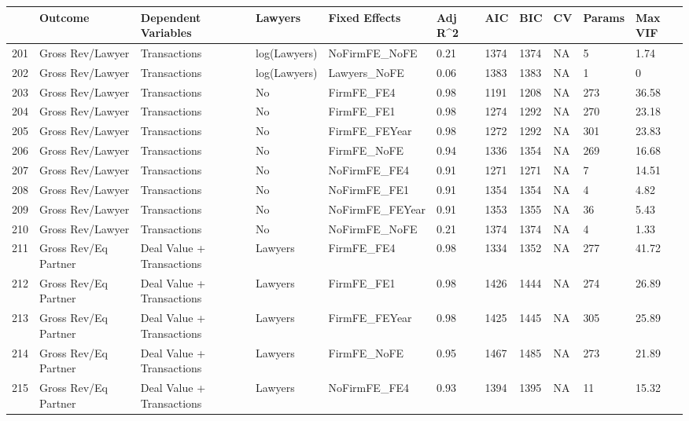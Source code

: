 \begin{table}[ht]
\centering
\begin{tabular}{rllllllllll}
  \hline
 & Outcome & Dependent Variables & Lawyers & Fixed Effects & Adj R^2 & AIC & BIC & CV & Params & Max VIF \\ 
  \hline
201 & Gross Rev/Lawyer & Transactions & log(Lawyers) & NoFirmFE\_NoFE & 0.21 & 1374 & 1374 & NA & 5 & 1.74 \\ 
  202 & Gross Rev/Lawyer & Transactions & log(Lawyers) & Lawyers\_NoFE & 0.06 & 1383 & 1383 & NA & 1 & 0 \\ 
  203 & Gross Rev/Lawyer & Transactions & No & FirmFE\_FE4 & 0.98 & 1191 & 1208 & NA & 273 & 36.58 \\ 
  204 & Gross Rev/Lawyer & Transactions & No & FirmFE\_FE1 & 0.98 & 1274 & 1292 & NA & 270 & 23.18 \\ 
  205 & Gross Rev/Lawyer & Transactions & No & FirmFE\_FEYear & 0.98 & 1272 & 1292 & NA & 301 & 23.83 \\ 
  206 & Gross Rev/Lawyer & Transactions & No & FirmFE\_NoFE & 0.94 & 1336 & 1354 & NA & 269 & 16.68 \\ 
  207 & Gross Rev/Lawyer & Transactions & No & NoFirmFE\_FE4 & 0.91 & 1271 & 1271 & NA & 7 & 14.51 \\ 
  208 & Gross Rev/Lawyer & Transactions & No & NoFirmFE\_FE1 & 0.91 & 1354 & 1354 & NA & 4 & 4.82 \\ 
  209 & Gross Rev/Lawyer & Transactions & No & NoFirmFE\_FEYear & 0.91 & 1353 & 1355 & NA & 36 & 5.43 \\ 
  210 & Gross Rev/Lawyer & Transactions & No & NoFirmFE\_NoFE & 0.21 & 1374 & 1374 & NA & 4 & 1.33 \\ 
  211 & Gross Rev/Eq Partner & Deal Value + Transactions & Lawyers & FirmFE\_FE4 & 0.98 & 1334 & 1352 & NA & 277 & 41.72 \\ 
  212 & Gross Rev/Eq Partner & Deal Value + Transactions & Lawyers & FirmFE\_FE1 & 0.98 & 1426 & 1444 & NA & 274 & 26.89 \\ 
  213 & Gross Rev/Eq Partner & Deal Value + Transactions & Lawyers & FirmFE\_FEYear & 0.98 & 1425 & 1445 & NA & 305 & 25.89 \\ 
  214 & Gross Rev/Eq Partner & Deal Value + Transactions & Lawyers & FirmFE\_NoFE & 0.95 & 1467 & 1485 & NA & 273 & 21.89 \\ 
  215 & Gross Rev/Eq Partner & Deal Value + Transactions & Lawyers & NoFirmFE\_FE4 & 0.93 & 1394 & 1395 & NA & 11 & 15.32 \\ 

\end{tabular}
\end{table}
